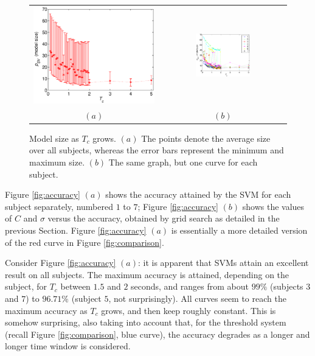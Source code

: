 \documentclass{article}
\begin{document}
\begin{figure}[!t]
  \centering
    \begin{tabular}{cc}
      \includegraphics[width=0.45\linewidth]{SVs.eps} &
      \includegraphics[width=0.45\textwidth]{svs_subj.eps} \\
      $(a)$ & $(b)$
    \end{tabular}
    \caption{Model size as $T_c$ grows. $(a)$ The points denote the
    average size over all subjects, whereas the error bars represent
    the minimum and maximum size. $(b)$ The same graph, but one curve
    for each subject.}
    \label{fig:svs}
\end{figure}

Figure \ref{fig:accuracy} $(a)$ shows the accuracy attained by the SVM
for each subject separately, numbered $1$ to $7$; Figure
\ref{fig:accuracy} $(b)$ shows the values of $C$ and $\sigma$ versus
the accuracy, obtained by grid search as detailed in the previous
Section. Figure \ref{fig:accuracy} $(a)$ is essentially a more
detailed version of the red curve in Figure \ref{fig:comparison}.

Consider Figure \ref{fig:accuracy} $(a)$: it is apparent that SVMs
attain an excellent result on all subjects. The maximum accuracy is
attained, depending on the subject, for $T_c$ between $1.5$ and $2$
seconds, and ranges from about $99\%$ (subjects $3$ and $7$) to
$96.71\%$ (subject $5$, not surprisingly). All curves seem to reach
the maximum accuracy as $T_c$ grows, and then keep roughly
constant. This is somehow surprising, also taking into account that,
for the threshold system (recall Figure \ref{fig:comparison}, blue
curve), the accuracy degrades as a longer and longer time window is
considered.
\end{document}
